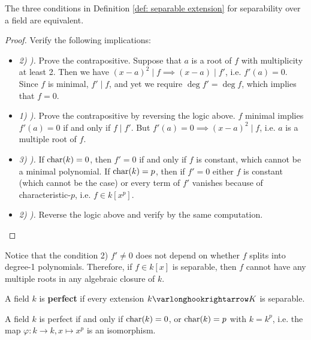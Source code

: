 \documentclass{article}
\begin{document}
\begin{proposition}
    The three conditions in Definition \ref{def: separable extension} for separability over a field are equivalent.
\end{proposition}

\begin{proof}
    Verify the following implications:
    \begin{itemize}
        \item \emph{2) ).} Prove the contrapositive. Suppose that $a$ is a root of $f$ with multiplicity at least 2. Then we have $(x - a)^2 \mid f \implies (x - a) \mid f'$, i.e. $f'(a) = 0$. Since $f$ is minimal, $f' \mid f$, and yet we require $\deg f' = \deg f$, which implies that $f = 0$.
        \item \emph{1) ).} Prove the contrapositive by reversing the logic above. $f$ minimal implies $f'(a) = 0$ if and only if $f \mid f'$. But $f'(a) = 0 \implies (x - a)^2 \mid f$, i.e. $a$ is a multiple root of $f$.
        \item \emph{3) ).} If $\mathrm{char}(k) = 0$, then $f' = 0$ if and only if $f$ is constant, which cannot be a minimal polynomial. If $\mathrm{char}(k) = p$, then if $f' = 0$ either $f$ is constant (which cannot be the case) or every term of $f'$ vanishes because of characteristic-$p$, i.e. $f \in k[x^p]$.
        \item \emph{2) ).} Reverse the logic above and verify by the same computation.
    \end{itemize}
\end{proof}

\begin{remark}
    Notice that the condition 2) $f' \neq 0$ does not depend on whether $f$ splits into degree-1 polynomials. Therefore, if $f \in k[x]$ is separable, then $f$ cannot have any multiple roots in any algebraic closure of $k$.
\end{remark}

\begin{definition}
    A field $k$ is \textbf{perfect} if every extension $k \ext K$ is separable.
\end{definition}

\begin{proposition}
    A field $k$ is perfect if and only if $\mathrm{char}(k) = 0$, or $\mathrm{char}(k) = p$ with $k = k^p$, i.e. the map $\varphi: k \to k, x \mapsto x^p$ is an isomorphism.
\end{proposition}
\end{document}
